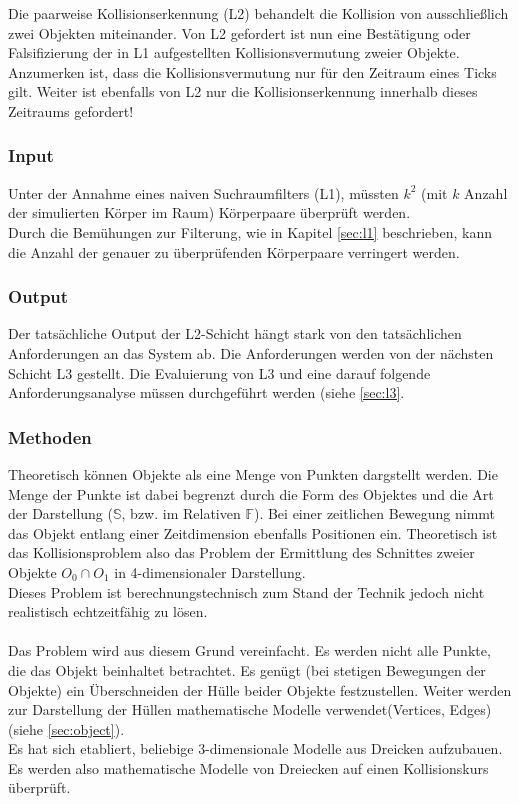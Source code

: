 
Die paarweise Kollisionserkennung (L2) behandelt die Kollision von ausschließlich zwei Objekten miteinander. Von L2 gefordert ist nun eine Bestätigung oder Falsifizierung der in L1 aufgestellten Kollisionsvermutung zweier Objekte.\\
Anzumerken ist, dass die Kollisionsvermutung nur für den Zeitraum eines Ticks gilt. Weiter ist ebenfalls von L2 nur die Kollisionserkennung innerhalb dieses Zeitraums gefordert!

\subsubsection{Input}
Unter der Annahme eines naiven Suchraumfilters (L1), müssten $k^2$ (mit $k$ Anzahl der simulierten Körper im Raum) Körperpaare überprüft werden.\\
Durch die Bemühungen zur Filterung, wie in Kapitel \ref{sec:l1}
 beschrieben, kann die Anzahl der genauer zu überprüfenden Körperpaare verringert werden.\\


\subsubsection{Output}
Der tatsächliche Output der L2-Schicht hängt stark von den tatsächlichen Anforderungen an das System ab. Die Anforderungen werden von der nächsten Schicht L3 gestellt. Die Evaluierung von L3 und eine darauf folgende Anforderungsanalyse müssen durchgeführt werden (siehe \ref{sec:l3}.\\

\subsubsection{Methoden}
Theoretisch können Objekte als eine Menge von Punkten dargstellt werden. Die Menge der Punkte ist dabei begrenzt durch die Form des Objektes und die Art der Darstellung ($\mathbb{S}$, bzw. im Relativen $\mathbb{F}$).
Bei einer zeitlichen Bewegung nimmt das Objekt entlang einer Zeitdimension ebenfalls Positionen ein. Theoretisch ist das Kollisionsproblem also das Problem der Ermittlung des Schnittes zweier Objekte $O_0 \cap O_1$ in 4-dimensionaler Darstellung.\\
Dieses Problem ist berechnungstechnisch zum Stand der Technik jedoch nicht realistisch echtzeitfähig zu lösen.\\
\\
Das Problem wird aus diesem Grund vereinfacht. Es werden nicht alle Punkte, die das Objekt beinhaltet betrachtet. Es genügt (bei stetigen Bewegungen der Objekte) ein Überschneiden der Hülle beider Objekte festzustellen.
Weiter werden zur Darstellung der Hüllen mathematische Modelle verwendet(Vertices, Edges)(siehe \ref{sec:object}).\\
Es hat sich etabliert, beliebige 3-dimensionale Modelle aus Dreicken aufzubauen. Es werden also mathematische Modelle von Dreiecken auf einen Kollisionskurs überprüft.\\

